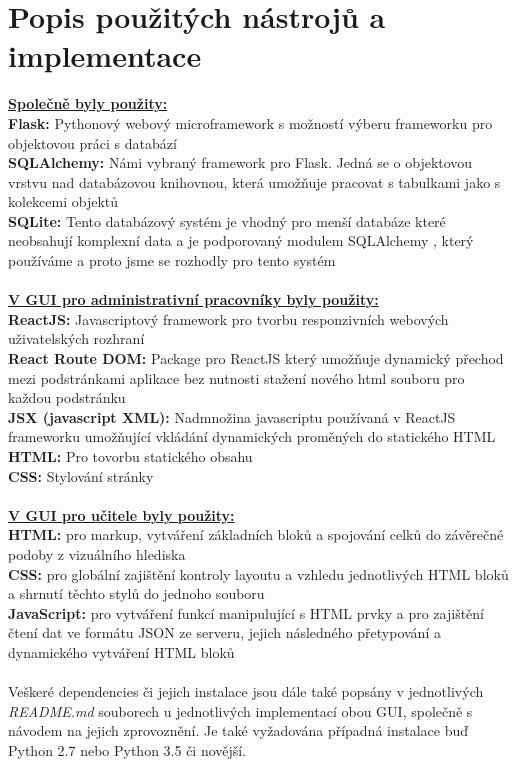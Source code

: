 \documentclass[a4paper, 11pt, twocolumn]{article}
\begin{document}
	
	\newpage


	\section*{\large{Popis použitých nástrojů a implementace}}
	\vspace*{-0.2cm}
	\vspace*{0.3cm}
	\noindent\textbf{\underline{Společně byly použity: }} \\
	\noindent\textbf{Flask: } Pythonový webový microframework s možností výberu frameworku pro objektovou práci s databází \\
	\noindent\textbf{SQLAlchemy: } Námi vybraný framework pro Flask. Jedná se o objektovou vrstvu nad databázovou knihovnou, která umožňuje pracovat s 
	tabulkami jako s kolekcemi objektů \\
	\noindent\textbf{SQLite: } Tento databázový systém je vhodný pro menší databáze které neobsahují komplexní data a je podporovaný modulem 
	SQLAlchemy , který používáme a proto jsme se rozhodly pro tento systém\\
	\vspace*{0.5cm} \\
	\noindent\textbf{\underline{V GUI pro administrativní pracovníky byly použity: }} \\
	\noindent\textbf{ReactJS: } Javascriptový framework pro tvorbu responzivních webových uživatelských rozhraní \\
	\noindent\textbf{React Route DOM: } Package pro ReactJS který umožňuje dynamický přechod mezi podstránkami aplikace bez nutnosti stažení nového html 
	souboru pro každou podstránku \\
	\noindent\textbf{JSX (javascript XML): } Nadmnožina javascriptu používaná v ReactJS frameworku umožňující vkládání dynamických proměných do 
	statického HTML \\
	\noindent\textbf{HTML: } Pro tovorbu statického obsahu \\
	\noindent\textbf{CSS: } Stylování stránky \\
	\vspace*{0.5cm} \\
	\noindent\textbf{\underline{V GUI pro učitele byly použity: }} \\
	\noindent\textbf{HTML: } pro markup, vytváření základních bloků a spojování celků do závěrečné podoby z vizuálního hlediska \\
	\noindent\textbf{CSS: } pro globální zajištění kontroly layoutu a vzhledu jednotlivých HTML bloků a shrnutí těchto stylů do jednoho souboru \\
	\noindent\textbf{JavaScript: } pro vytváření funkcí manipulující s HTML prvky a pro zajištění čtení dat ve formátu JSON ze serveru, jejich následného 
	přetypování a dynamického vytváření HTML bloků \\
	\vspace*{0.5cm} \\
	\noindent Veškeré dependencies či jejich instalace jsou dále také popsány v jednotlivých \textit{README.md} souborech u jednotlivých implementací obou 
	GUI, společně s návodem na jejich zprovoznění. Je také vyžadována případná instalace buď Python 2.7 nebo Python 3.5 či novější. \\
	
\end{document}

